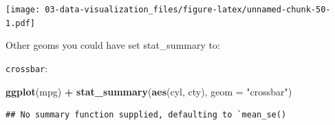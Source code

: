 \documentclass[]{book}
\newenvironment{Shaded}{\begin{snugshade}}{\end{snugshade}}
\newcommand{\DataTypeTok}[1]{\textcolor[rgb]{0.13,0.29,0.53}{#1}}
\newcommand{\DecValTok}[1]{\textcolor[rgb]{0.00,0.00,0.81}{#1}}
\newcommand{\FloatTok}[1]{\textcolor[rgb]{0.00,0.00,0.81}{#1}}
\newcommand{\KeywordTok}[1]{\textcolor[rgb]{0.13,0.29,0.53}{\textbf{#1}}}
\newcommand{\NormalTok}[1]{#1}
\newcommand{\OperatorTok}[1]{\textcolor[rgb]{0.81,0.36,0.00}{\textbf{#1}}}
\newcommand{\StringTok}[1]{\textcolor[rgb]{0.31,0.60,0.02}{#1}}
\theoremstyle{definition}
\theoremstyle{definition}
\theoremstyle{definition}
\theoremstyle{remark}
\begin{document}
\begin{Shaded}
\end{Shaded}

\texttt{[image: 03-data-visualization\_files/figure-latex/unnamed-chunk-50-1.pdf]}

Other geoms you could have set stat\_summary to:

\texttt{crossbar}:

\begin{Shaded}
\begin{Highlighting}[]
\KeywordTok{ggplot}\NormalTok{(mpg) }\OperatorTok{+}
\StringTok{  }\KeywordTok{stat_summary}\NormalTok{(}\KeywordTok{aes}\NormalTok{(cyl, cty), }\DataTypeTok{geom =} \StringTok{"crossbar"}\NormalTok{)}
\end{Highlighting}
\end{Shaded}

\begin{verbatim}
## No summary function supplied, defaulting to `mean_se()
\end{verbatim}
\end{document}
